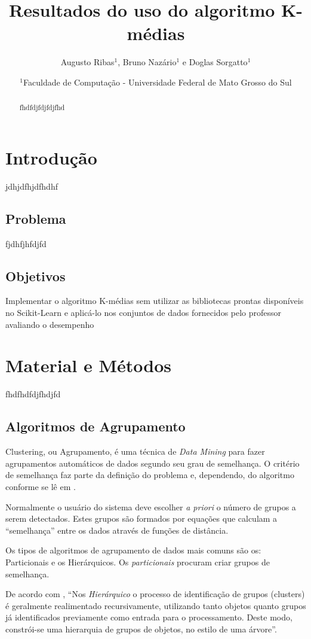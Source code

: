 \documentclass[12pt, a4paper]{article}
\title{Resultados do uso do algoritmo K-médias}
\author{Augusto Ribas$^1$, Bruno Nazário$^1$ e Doglas Sorgatto$^1$}
\date{$^1$Faculdade de Computação - Universidade Federal de Mato Grosso do Sul}
\begin{document}
\maketitle

\begin{abstract}
fhdfdjfdjfdjfhd
\end{abstract}
%
\section{Introdução}
jdhjdfhjdfhdhf


\subsection{Problema}
fjdhfjhfdjfd

\subsection{Objetivos}
Implementar o algoritmo K-médias sem utilizar as bibliotecas prontas disponíveis no Scikit-Learn \citep{scikit-learn} e aplicá-lo nos conjuntos de dados fornecidos pelo professor avaliando o desempenho


\section{Material e Métodos}
fhdfhdfdjfhdjfd

\subsection{Algoritmos de Agrupamento}
Clustering, ou Agrupamento,  é uma técnica de \textit{Data Mining} para fazer agrupamentos automáticos de dados segundo seu grau de semelhança. O critério de semelhança faz parte da definição do problema e, dependendo, do algoritmo conforme se lê em \citep{clustering}.

Normalmente o usuário do sistema deve escolher \textit{a priori} o número de grupos a serem detectados. Estes grupos são formados por equações que calculam a ``semelhança'' entre os dados através de funções de distância.

Os tipos de algoritmos de agrupamento de dados mais comuns são os: Particionais e os Hierárquicos. Os \emph{particionais} procuram criar grupos de semelhança.

De acordo com \citep{hierarquico}, ``Nos \emph{Hierárquico} o processo de identificação de grupos (clusters) é geralmente realimentado recursivamente, utilizando tanto objetos quanto grupos já identificados previamente como entrada para o processamento. Deste modo, constrói-se uma hierarquia de grupos de objetos, no estilo de uma árvore''.
\end{document}
